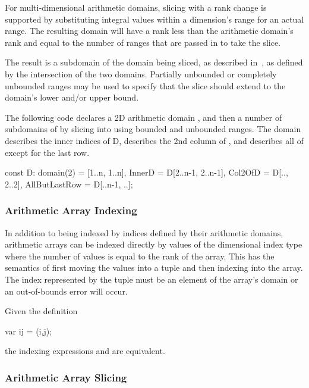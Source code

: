 For multi-dimensional arithmetic domains, slicing with a rank change
is supported by substituting integral values within a dimension's
range for an actual range.  The resulting domain will have a rank less
than the arithmetic domain's rank and equal to the number of ranges
that are passed in to take the slice.

The result is a subdomain of the domain being sliced, as described
in~, as defined by the intersection of the two
domains.  Partially unbounded or completely unbounded ranges may be
used to specify that the slice should extend to the domain's lower
and/or upper bound.

\begin{example}
The following code declares a 2D arithmetic domain , and then
a number of subdomains of  by slicing into  using
bounded and unbounded ranges.  The  domain describes the
inner indices of D,  describes the 2nd column of
, and  describes all of  except
for the last row.

\begin{chapel}
const D: domain(2) = [1..n, 1..n],
      InnerD = D[2..n-1, 2..n-1],
      Col2OfD = D[.., 2..2],
      AllButLastRow = D[..n-1, ..];
\end{chapel}
\end{example}


\subsubsection{Arithmetic Array Indexing}
\label{Arithmetic_Array_Indexing}

In addition to being indexed by indices defined by their arithmetic
domains, arithmetic arrays can be indexed directly by values of the
dimensional index type where the number of values is equal to the rank
of the array.  This has the semantics of first moving the values into
a tuple and then indexing into the array.  The index represented by
the tuple must be an element of the array's domain or an out-of-bounds
error will occur.

\begin{example}
Given the definition
\begin{chapel}
  var ij = (i,j);
\end{chapel}
the indexing expressions  and  are
equivalent.
\end{example}

\subsubsection{Arithmetic Array Slicing}
\label{Arithmetic_Array_Slicing}

